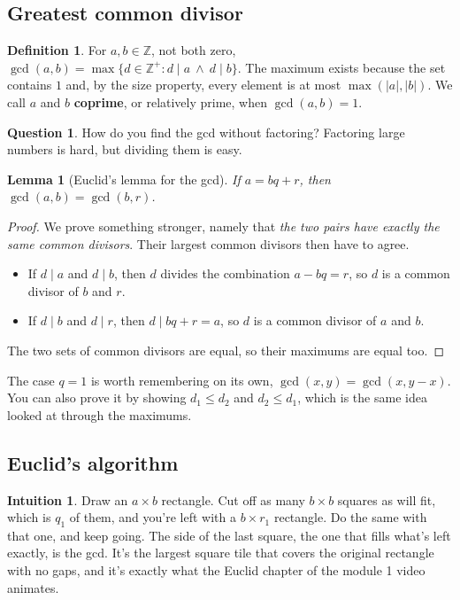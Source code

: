 \documentclass[11pt,a4paper]{article}
\newtheorem{lemma}[theorem]{Lemma}
\theoremstyle{definition}
\newtheorem{definition}[theorem]{Definition}
\newcommand{\Z}{\mathbb{Z}}
\theoremstyle{noteit}
\newtheorem*{question}{Question}
\theoremstyle{note}
\newtheorem*{intuition}{Intuition}
\begin{document}
\subsection{Greatest common divisor}

\begin{definition}
For $a,b\in\Z$, not both zero, $\gcd(a,b)=\max\{d\in\Z^+ : d\mid a\ \wedge\ d\mid b\}$. The maximum exists because the set contains $1$ and, by the size property, every element is at most $\max(|a|,|b|)$. We call $a$ and $b$ \textbf{coprime}, or relatively prime, when $\gcd(a,b)=1$.
\end{definition}

\begin{question}
How do you find the gcd without factoring? Factoring large numbers is hard, but dividing them is easy.
\end{question}

\begin{lemma}[Euclid's lemma for the gcd]
If $a=bq+r$, then $\gcd(a,b)=\gcd(b,r)$.
\end{lemma}

\begin{proof}
We prove something stronger, namely that \emph{the two pairs have exactly the same common divisors}. Their largest common divisors then have to agree.
\begin{itemize}
\item If $d\mid a$ and $d\mid b$, then $d$ divides the combination $a-bq=r$, so $d$ is a common divisor of $b$ and $r$.
\item If $d\mid b$ and $d\mid r$, then $d\mid bq+r=a$, so $d$ is a common divisor of $a$ and $b$.
\end{itemize}
The two sets of common divisors are equal, so their maximums are equal too.
\end{proof}

The case $q=1$ is worth remembering on its own, $\gcd(x,y)=\gcd(x,y-x)$. You can also prove it by showing $d_1\le d_2$ and $d_2\le d_1$, which is the same idea looked at through the maximums.

\subsection{Euclid's algorithm}

\begin{intuition}
Draw an $a\times b$ rectangle. Cut off as many $b\times b$ squares as will fit, which is $q_1$ of them, and you're left with a $b\times r_1$ rectangle. Do the same with that one, and keep going. The side of the last square, the one that fills what's left exactly, is the gcd. It's the largest square tile that covers the original rectangle with no gaps, and it's exactly what the Euclid chapter of the module 1 video animates.
\end{intuition}
\end{document}

